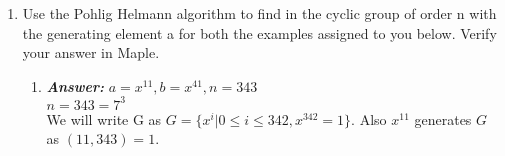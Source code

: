 \documentclass[11pt,a4paper,fleqn]{article}
\makeatletter
\newcommand{\tpmod}[1]{{\@displayfalse\pmod{#1}}}
\newcommand\Tstrut{\rule{0pt}{2.6ex}}         %
\makeatother
\begin{document}
\begin{enumerate}[1.]
\begin{flushleft}
\begin{enumerate}
\begin{enumerate}[Step 1.]
\begin{table}[H]
{\begin{tabular}{|l|l|}
						\hline
						8 & $24.26^{-8} = 24.26^{44} = 49$ \Tstrut\\
						\hline
					\end{tabular}
					\caption{Step 3}}
			\end{table}
			\item We found a collision in both the tables for $value = 49$ where $i = 8$ and $mj = 8 \times 3$
			\item We calculate $t = (mj + i)\tpmod{53} = (8 \times 3 + 8)\tpmod{53} \equiv 32\tpmod{53}$\\
			$\implies 26^{32} \equiv 24\tpmod{53}$
			\item Verifying the answer using Fast Modular Exponentiation:
			\begin{align*}
				& 26^2 \equiv 40\tpmod{53} \\
				& \therefore 26^4 = (26^2)^2 = 40^2 \equiv 10\tpmod{53} \\
				& \implies 26^{16} = (26^4)^4 = 10^4 \equiv 36\tpmod{53} \\
				& \implies 26^{32} = (26^{16})^2 = 36^2 \equiv 24\tpmod{53} \text{ and hence the answer}
			\end{align*}
		\end{enumerate}
		\end{enumerate}
		\end{flushleft}
		\item Use the Pohlig Helmann algorithm to find in the cyclic group of order n with the generating element a for both the examples assigned to you below. Verify your answer in Maple.
		\begin{flushleft}
			\begin{enumerate}
				\item \textbf{\textit{Answer:}} $a = x^{11}, b = x^{41}, n = 343$ \\ \bigbreak
				$n = 343 = 7^3$\\
				We will write G as $G = \{x^i | 0 \le i \le 342, x^{342} = 1\}$. Also $x^{11}$ generates $G$ as $(11, 343) = 1$.\\


\end{enumerate}
\end{flushleft}
\end{enumerate}
\end{document}
